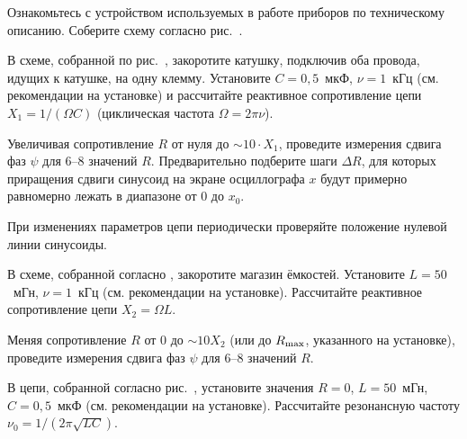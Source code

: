 \begin{lab:task}


\item Ознакомьтесь с устройством используемых в работе приборов по техническому
описанию. Соберите схему согласно рис.~.

\item В схеме, собранной по рис.~, закоротите катушку, подключив оба провода, 
идущих к катушке, на одну клемму. Установите $C=0,5$~мкФ, $\nu=1$~кГц 
(см. рекомендации на установке) и 
рассчитайте реактивное сопротивление цепи $X_1=1/(\Omega C)$
(циклическая частота $\Omega=2\pi\nu$).

\item Увеличивая сопротивление $R$ от нуля до $\sim 10\cdot X_1$, проведите 
измерения сдвига фаз $\psi$ для 6--8 значений $R$.
Предварительно подберите шаги $\Delta R$, для которых приращения 
сдвиги синусоид на экране осциллографа $x$ будут примерно равномерно
лежать в диапазоне от 0 до $x_0$. 

При изменениях параметров цепи периодически проверяйте положение 
нулевой линии синусоиды.


\item В схеме, собранной согласно , закоротите магазин ёмкостей. 
Установите $L=50$~мГн, $\nu=1$~кГц (см. рекомендации на установке). 
Рассчитайте реактивное сопротивление цепи $X_2=\Omega L$.

\item Меняя сопротивление $R$ от 0 до $\sim 10X_2$ 
(или до $R_{\rm max}$, указанного на установке), 
проведите измерения сдвига фаз $\psi$ для 6--8 значений $R$.


\item В цепи, собранной согласно рис.~, установите значения 
$R=0$, $L=50$~мГн, $C=0,5$~мкФ (см. рекомендации на установке). 
Рассчитайте резонансную частоту $\nu_0=1/(2\pi\sqrt{LC})$.
 

\end{lab:task}
